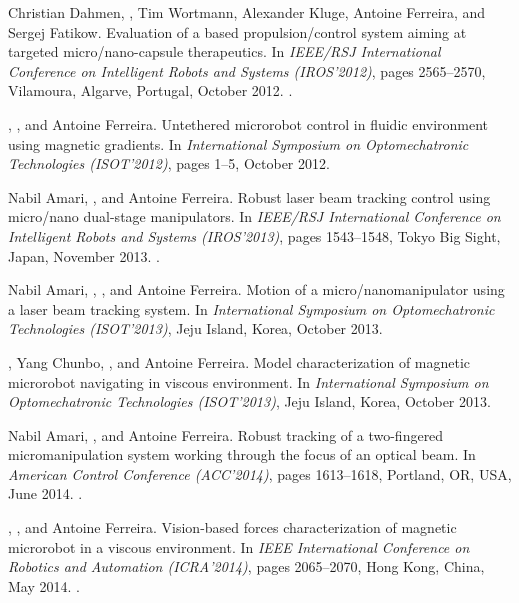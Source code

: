 \begin{Mybibliography}{10}
  
  Christian Dahmen, \DavidFolio, Tim Wortmann, Alexander Kluge, Antoine Ferreira,
  and Sergej Fatikow.
  \newblock Evaluation of a {\MRI} based propulsion/control system aiming at
  targeted micro/nano-capsule therapeutics.
  \newblock In \emph{IEEE/RSJ International Conference on Intelligent Robots and
    Systems (IROS'2012)}, pages 2565--2570, Vilamoura, Algarve, Portugal, October
  2012.
  \newblock {}.
    
  \KBelharet, \DavidFolio, and Antoine Ferreira.
  \newblock Untethered microrobot control in fluidic environment using magnetic
  gradients.
  \newblock In \emph{International Symposium on Optomechatronic Technologies
    (ISOT'2012)}, pages 1--5, October 2012{}.
  
  
  Nabil Amari, \DavidFolio, and Antoine Ferreira.
  \newblock Robust laser beam tracking control using micro/nano dual-stage
  manipulators.
  \newblock In \emph{IEEE/RSJ International Conference on Intelligent Robots and
    Systems (IROS'2013)}, pages 1543--1548, Tokyo Big Sight, Japan, November
  2013{}.
  \newblock {}.
  
  
  Nabil Amari, \DavidFolio, \KBelharet, and Antoine Ferreira.
  \newblock Motion of a micro/nanomanipulator using a laser beam tracking system.
  \newblock In \emph{International Symposium on Optomechatronic Technologies
    (ISOT'2013)}, Jeju Island, Korea, October 2013{}.
  

  \KBelharet, Yang Chunbo, \DavidFolio, and Antoine Ferreira.
  \newblock Model characterization of magnetic microrobot navigating in viscous
  environment.
  \newblock In \emph{International Symposium on Optomechatronic Technologies
    (ISOT'2013)}, Jeju Island, Korea, October 2013{}.
  
  Nabil Amari, \DavidFolio, and Antoine Ferreira.
  \newblock Robust tracking of a two-fingered micromanipulation system working
  through the focus of an optical beam.
  \newblock In \emph{American Control Conference (ACC'2014)}, pages 1613--1618,
  Portland, OR, USA, June 2014{}.
  \newblock {}.
  
  \KBelharet, \DavidFolio, and Antoine Ferreira.
  \newblock Vision-based forces characterization of magnetic microrobot in a
  viscous environment.
  \newblock In \emph{IEEE International Conference on Robotics and Automation
    (ICRA'2014)}, pages 2065--2070, Hong Kong, China, May 2014{}.
  \newblock {}.
  

\end{Mybibliography}
